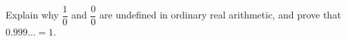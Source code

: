Explain why $\dfrac{1}{0}$ and $\dfrac{0}{0}$ are undefined in ordinary real arithmetic, and prove that $0.999\ldots=1$.
